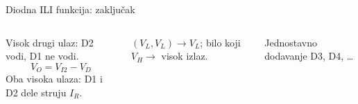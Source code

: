 \begin{frame}[label=10-s041]{Diodna ILI funkcija: zaključak}
\setlength{\abovedisplayskip}{4pt}\setlength{\belowdisplayskip}{4pt}\setlength{\abovedisplayshortskip}{3pt}\setlength{\belowdisplayshortskip}{3pt}
\begin{columns}[T,onlytextwidth]\centering \raggedright
Visok drugi ulaz: D2 vodi, D1 ne vodi.
\[V_O=V_{I2}-V_D\]
Oba visoka ulaza: D1 i D2 dele struju $I_R$.\par
$(V_L,V_L)\to V_L$; bilo koji $V_H\to$ visok izlaz.\par
Jednostavno dodavanje D3, D4, \ldots\par\smallskip
\centering\end{columns}\smallskip{}
\end{frame}
